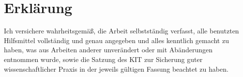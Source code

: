 \documentclass[a4paper]{article}
\begin{document}
  	\tableofcontents

	\newpage

	\pagestyle{headings}
	
	
	
	
 
	
	
	
	
	
	





	
	\newpage

	\printbibliography
 
      
      
  	

	\newpage
  
 	\thispagestyle{empty}

	\vspace*{8cm}


	\section*{Erklärung}

	Ich  versichere  wahrheitsgemäß,  die  Arbeit selbstständig verfasst,  alle  benutzten
	Hilfsmittel  vollständig  und  genau  angegeben  und  alles kenntlich  gemacht  zu  haben,  
	was  aus  Arbeiten  anderer  unverändert  oder  mit  Abänderungen entnommen  wurde,  sowie 
	die Satzung  des  KIT  zur  Sicherung guter wissenschaftlicher Praxis in der jeweils gültigen 
	Fassung beachtet zu haben.
	\\[2ex] 

	\noindent
	\\[5ex]

\end{document}
